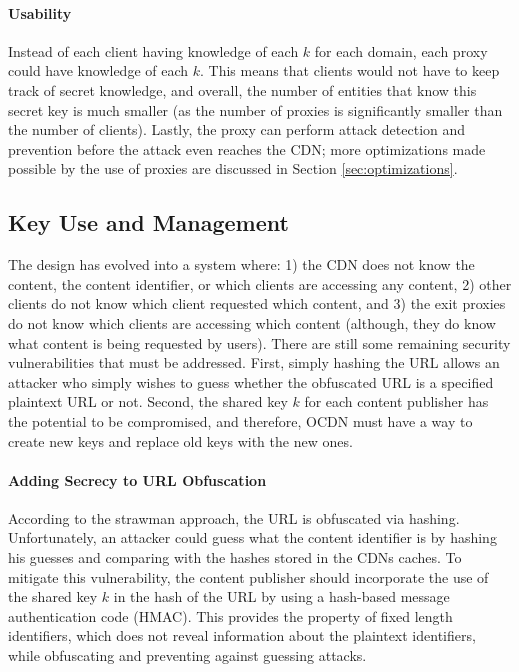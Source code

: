 \paragraph{Usability} Instead of each client having knowledge 
of each $k$ for each domain, each proxy could have knowledge of each $k$.  This means that clients would 
not have to keep track of secret knowledge, and overall, the number of entities that know this secret key 
is much smaller (as the number of proxies is significantly smaller than the number of clients).  Lastly, 
the proxy can perform attack detection and prevention before the attack even reaches the CDN; more optimizations 
made possible by the use of proxies are discussed in Section \ref{sec:optimizations}.

\subsection{Key Use and Management}
\label{sec:keys}
The design has evolved into a system where: 1) the CDN does not know the content, the content identifier, 
or which clients are accessing any content, 2) other clients do not know which client requested which content, and 
3) the exit proxies do not know which clients are accessing which content (although, they do know what content is
being requested by \system{} users).  There are still 
some remaining security vulnerabilities that must be addressed.  First, simply hashing the URL allows an attacker who simply 
wishes to guess whether the obfuscated URL is a specified plaintext URL or not.  Second, the shared key $k$ for each content 
publisher has the potential to be compromised, and therefore, OCDN must have a way to create new keys and replace 
old keys with the new ones.

\paragraph{Adding Secrecy to URL Obfuscation} According to the strawman approach, the URL is obfuscated via hashing.  Unfortunately, 
an attacker could guess what the content identifier is by hashing his guesses and comparing with the hashes stored in the 
CDNs caches.  To mitigate this vulnerability, the content publisher should incorporate the use of the shared key $k$ in the 
hash of the URL by using a hash-based message authentication code (HMAC).  This provides the property of fixed length 
identifiers, which does not reveal information about the plaintext identifiers, while obfuscating and preventing 
against guessing attacks.  

